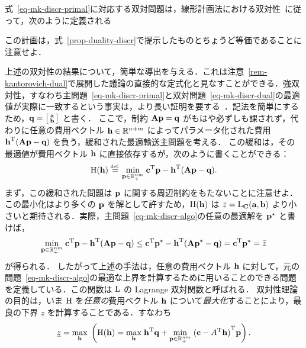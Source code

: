 式~\eqref{eq-mk-discr-primal}に対応する双対問題は，線形計画法における双対性~\citep[p. 143]{bertsimas1997introduction}に従って，次のように定義される

この計画は，式~\eqref{prop-duality-discr}で提示したものとちょうど等価であることに注意せよ．


\begin{rem}\label{rem-duality} 上述の双対性の結果について，簡単な導出を与える．これは注意~\ref{rem-kantorovich-dual}で展開した議論の直接的な定式化と見なすことができる．強双対性，すなわち主問題~\eqref{eq-mk-discr-primal}と双対問題~\eqref{eq-mk-discr-dual}の最適値が実際に一致するという事実は，より長い証明を要する~\citep[\S4.10]{bertsimas1997introduction}．記法を簡単にするため，$\q=\bigl[\begin{smallmatrix}\a\\ \b \end{smallmatrix} \bigr]$ と書く．
ここで，制約 $\mathbf{A}\p=\q$ がもはや必ずしも課されず，代わりに任意の費用ベクトル $\hD\in\RR^{n+m}$ によってパラメータ化された費用 $\transp{\hD}(\mathbf{A}\p-\q)$ を負う，緩和された最適輸送主問題を考える．
この緩和は，その最適値が費用ベクトル $\hD$ に直接依存するが，次のように書くことができる：
$$\LagrangeMKD(\hD)\eqdef \umin{\p \in \RR^{nm}_+} \transp{\cc}\p-\transp{\hD}(\mathbf{A}\p-\q).$$
まず，この緩和された問題は $\p$ に関する周辺制約をもたないことに注意せよ．この最小化はより多くの $\p$ を解として許すため，$\LagrangeMKD(\hD)$ は $\bar{z}=\MKD_{\C}(\a,\b)$ より小さいと期待される．実際，主問題~\eqref{eq-mk-discr-algo}の任意の最適解を $\p^\star$ と書けば，
$$\umin{\p \in \RR^{nm}_+} \transp{\cc}\p-\transp{\hD}(\mathbf{A}\p-\q) \leq \transp{\cc}\p^\star-\transp{\hD}(\mathbf{A}\p^\star-\q)=\transp{\cc}\p^\star=\bar{z}$$
が得られる．
したがって上述の手法は，任意の費用ベクトル $\hD$ に対して，元の問題~\eqref{eq-mk-discr-algo}の最適な上界を計算するために用いることのできる問題を定義している．この関数は $\MKD$ の Lagrange 双対関数と呼ばれる．
双対性理論の目的は，いま $\LagrangeMKD$ を\emph{任意の}費用ベクトル $\hD$ について\emph{最大化}することにより，最良の下界 $\underline{z}$ を計算することである．すなわち
$$
	\underline{z}=\umax{\hD} \pa{ \LagrangeMKD(\hD)=\umax{\hD} \transp{\hD}\q + \umin{\p \in \RR^{nm}_+} \transp{(\cc-\transp{A}\hD)}\p }.
$$
\end{rem}

